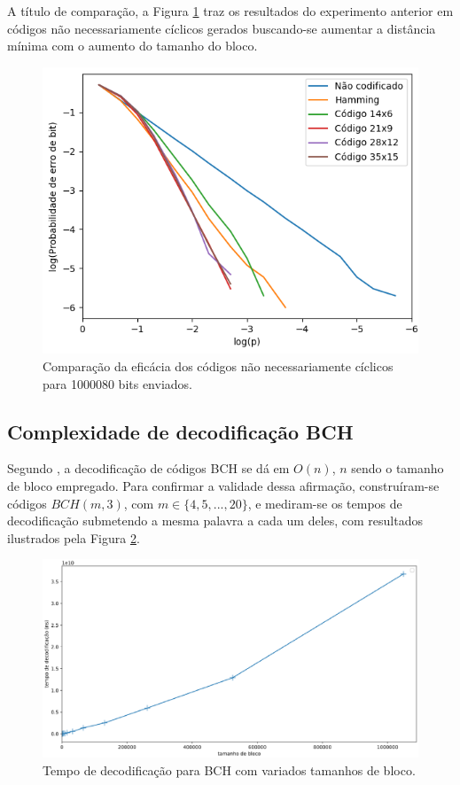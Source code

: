 A título de comparação, a Figura \ref{fig:non_cyclic_comparison} traz os resultados do experimento anterior em códigos não necessariamente cíclicos gerados buscando-se aumentar a distância mínima com o aumento do tamanho do bloco.

\begin{figure}[!hb]
	\centering
	\captionsetup{justification=centering}
	\includegraphics[scale=0.45]{floats/non_cyclic.png}
	\caption{\label{fig:non_cyclic_comparison}Comparação da eficácia dos códigos não necessariamente cíclicos para 1000080 bits enviados.}
\end{figure}


\subsection{\label{complexidade_decod}Complexidade de decodificação BCH}

Segundo \cite{ref:algoritmo-berlekamp}, a decodificação de códigos BCH se dá em $O(n)$, $n$ sendo o tamanho de bloco empregado. Para confirmar a validade dessa afirmação, construíram-se códigos $BCH(m, 3)$, com $m \in \lbrace 4,5,...,20 \rbrace$, e mediram-se os tempos de decodificação submetendo a mesma palavra a cada um deles, com resultados ilustrados pela Figura \ref{fig:bch_decoding_is_linear}.

\begin{figure}[!hb]
	\centering
    \captionsetup{justification=centering}
	\includegraphics[scale=0.3]{floats/bch-decode-is-linear.eps}
	\caption{\label{fig:bch_decoding_is_linear}Tempo de decodificação para BCH com variados tamanhos de bloco.}
\end{figure}